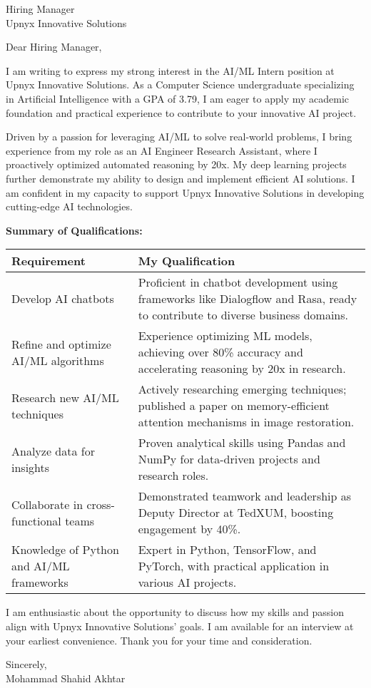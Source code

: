 \documentclass[10.5pt]{letter}
\date{\today}
\begin{document}
\begin{letter}{Hiring Manager\\Upnyx Innovative Solutions}

\opening{Dear Hiring Manager,}

I am writing to express my strong interest in the AI/ML Intern position at Upnyx Innovative Solutions. As a Computer Science undergraduate specializing in Artificial Intelligence with a GPA of 3.79, I am eager to apply my academic foundation and practical experience to contribute to your innovative AI project.

Driven by a passion for leveraging AI/ML to solve real-world problems, I bring experience from my role as an AI Engineer Research Assistant, where I proactively optimized automated reasoning by 20x. My deep learning projects further demonstrate my ability to design and implement efficient AI solutions. I am confident in my capacity to support Upnyx Innovative Solutions in developing cutting-edge AI technologies.

\vspace{0.2cm}
\textbf{Summary of Qualifications:}
\vspace{0.1cm}

\renewcommand{\arraystretch}{1.3}
\begin{tabularx}{\textwidth}{@{}p{}X@{}}
\textbf{Requirement} & \textbf{My Qualification} \\
\hline
Develop AI chatbots & Proficient in chatbot development using frameworks like Dialogflow and Rasa, ready to contribute to diverse business domains. \\
Refine and optimize AI/ML algorithms & Experience optimizing ML models, achieving over 80\% accuracy and accelerating reasoning by 20x in research. \\
Research new AI/ML techniques & Actively researching emerging techniques; published a paper on memory-efficient attention mechanisms in image restoration. \\
Analyze data for insights & Proven analytical skills using Pandas and NumPy for data-driven projects and research roles. \\
Collaborate in cross-functional teams & Demonstrated teamwork and leadership as Deputy Director at TedXUM, boosting engagement by 40\%. \\
Knowledge of Python and AI/ML frameworks & Expert in Python, TensorFlow, and PyTorch, with practical application in various AI projects. \\
\end{tabularx}

\vspace{0.4cm}
I am enthusiastic about the opportunity to discuss how my skills and passion align with Upnyx Innovative Solutions' goals.  I am available for an interview at your earliest convenience. Thank you for your time and consideration.

\vspace{0.4cm}
\begin{flushleft}
Sincerely,\\[1.5ex]
Mohammad Shahid Akhtar
\end{flushleft}

\end{letter}
\end{document}
